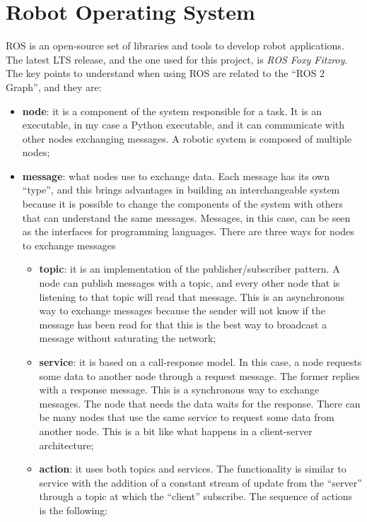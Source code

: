 \documentclass[../thesis.tex]{subfiles}
\begin{document}
\section{Robot Operating System}
\acrfull{ROS} is an open-source set of libraries and tools to develop robot applications. The latest \acrshort{LTS} release, and the one used for this project, is \textit{ROS Foxy Fitzroy}. The key points to understand when using \acrshort{ROS} are related to the ``ROS 2 Graph'', and they are:
\begin{itemize}
    \item \textbf{node}: it is a component of the system responsible for a task. It is an executable, in my case a Python executable, and it can communicate with other nodes exchanging messages. A robotic system is composed of multiple nodes;
    \item \textbf{message}: what nodes use to exchange data. Each message has its own ``type'', and this brings advantages in building an interchangeable system because it is possible to change the components of the system with others that can understand the same messages. Messages, in this case, can be seen as the interfaces for programming languages. There are three ways for nodes to exchange messages
        \begin{itemize}
            \item \textbf{topic}: it is an implementation of the publisher/subscriber pattern. A node can publish messages with a topic, and every other node that is listening to that topic will read that message. This is an asynchronous way to exchange messages because the sender will not know if the message has been read for that this is the best way to broadcast a message without saturating the network;
            \item \textbf{service}: it is based on a call-response model. In this case, a node requests some data to another node through a request message. The former replies with a response message. This is a synchronous way to exchange messages. The node that needs the data waits for the response. There can be many nodes that use the same service to request some data from another node. This is a bit like what happens in a client-server architecture;
            \item \textbf{action}: it uses both topics and services. The functionality is similar to service with the addition of a constant stream of update from the ``server'' through a topic at which the ``client'' subscribe. The sequence of actions is the following:
                \begin{enumerate}

\end{enumerate}
\end{itemize}
\end{itemize}
\end{document}
